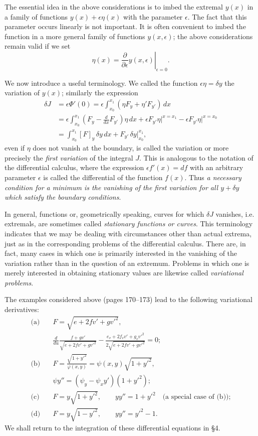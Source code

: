 The essential idea in the above considerations is to imbed the extremal $y(x)$ in a family of functions $y(x)+\epsilon\eta(x)$ with the parameter $\epsilon$. The fact that this parameter occurs linearly is not important. It is often convenient to imbed the function in a more general family of functions $y(x,\epsilon)$; the above considerations remain valid if we set
\[
\eta(x)=\left.\frac{\partial}{\partial\epsilon}y(x,\epsilon)\right|_{\epsilon=0}.
\]

We now introduce a useful terminology. We called the function $\epsilon\eta=\delta y$ the variation of $y(x)$; similarly the expression
\begin{align}\tag{15}
\delta J
&=\epsilon\Phi'(0)=\epsilon\int_{x_0}^{x_1}(\eta F_y+\eta'F_{y'})\,dx\\
&=\epsilon\int_{x_0}^{x_1}\left(F_y-\frac{d}{dx}F_{y'}\right)\eta\,dx
 +\epsilon F_{y'}\eta\big|^{x=x_1}-\epsilon F_{y'}\eta\big|^{x=x_0}\\
&=\int_{x_0}^{x_1}[F]_y\,\delta y\,dx+F_{y'}\,\delta y\big|_{x_0}^{x_1},
\end{align}
even if $\eta$ does not vanish at the boundary, is called the variation or more precisely the \emph{first variation} of the integral $J$. This is analogous to the notation of the differential calculus, where the expression $\epsilon f'(x)=df$ with an arbitrary parameter $\epsilon$ is called the differential of the function $f(x)$. Thus \emph{a necessary condition for a minimum is the vanishing of the first variation for all $y+\delta y$ which satisfy the boundary conditions}.

In general, functions or, geometrically speaking, curves for which $\delta J$ vanishes, i.e. extremals, are sometimes called \emph{stationary functions or curves}. This terminology indicates that we may be dealing with circumstances other than actual extrema, just as in the corresponding problems of the differential calculus. There are, in fact, many cases in which one is primarily interested in the vanishing of the variation rather than in the question of an extremum. Problems in which one is merely interested in obtaining stationary values are likewise called \emph{variational problems}.

The examples considered above (pages 170--173) lead to the following variational derivatives:
\begin{align*}
\text{(a)}\quad &F=\sqrt{e+2fv'+gv'^2},\\
&\frac{d}{du}\frac{f+gv'}{\sqrt{e+2fv'+gv'^2}}
-\frac{e_v+2f_vv'+g_vv'^2}{2\sqrt{e+2fv'+gv'^2}}=0;\\[0.5em]
\text{(b)}\quad &F=\frac{\sqrt{1+y'^2}}{\varphi(x,y)}=\psi(x,y)\sqrt{1+y'^2},\\
&\psi y''=(\psi_y-\psi_x y')(1+y'^2);\\[0.5em]
\text{(c)}\quad &F=y\sqrt{1+y'^2},\qquad yy''=1+y'^2\quad\text{(a special case of (b));}\\[0.5em]
\text{(d)}\quad &F=y\sqrt{1-y'^2},\qquad yy''=y'^2-1.
\end{align*}
We shall return to the integration of these differential equations in \S4.

